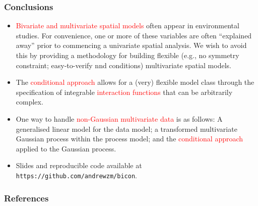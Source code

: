 \documentclass{beamer}
\begin{document}
\begin{frame}
\frametitle{Conclusions}
\vspace{-.8cm}
\begin{itemize}
\item \textcolor{red}{Bivariate and multivariate spatial models} often appear in environmental studies. For convenience, one or more of these variables are often ``explained away'' prior to commencing a univariate spatial analysis. We wish to avoid this by providing a methodology for building flexible (e.g., no symmetry constraint; easy-to-verify nnd conditions) multivariate spatial models.
\item The \textcolor{red}{conditional approach} allows for a (very) flexible model class through the specification of integrable \textcolor{red}{interaction functions} that can be arbitrarily complex.
\item One way to handle \textcolor{red}{non-Gaussian multivariate data} is as follows: A generalised linear model for the data model;  a transformed multivariate Gaussian process within the process model; and the \textcolor{red}{conditional approach} applied to the Gaussian process.
\item Slides and reproducible code available at \texttt{https://github.com/andrewzm/bicon}.
\end{itemize}
\end{frame}

\small

\begin{frame}[allowframebreaks]
\frametitle{References}


\vspace{-1cm}



\end{frame}
\end{document}
